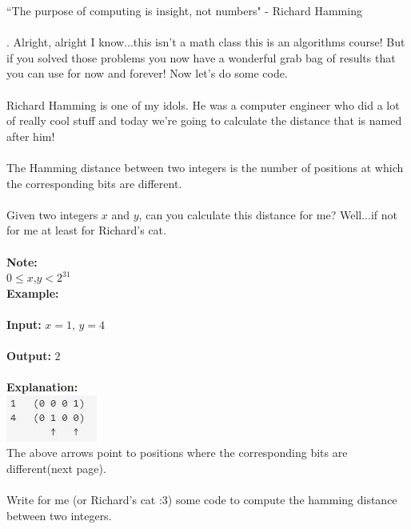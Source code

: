 \documentclass[12pt]{article}
\begin{document}
``The purpose of computing is insight, not numbers" - Richard Hamming\\\\
. Alright, alright I know...this isn't a math class this is an algorithms course! But if you solved those problems you now have a wonderful grab bag of results that you can use for now and forever! Now let's do some code.\\\\
Richard Hamming is one of my idols. He was a computer engineer who did a lot of really cool stuff and today we're going to calculate the distance that is named after him!\\\\
The Hamming distance between two integers is the number of positions at which the corresponding bits are different.\\\\
Given two integers $x$ and $y$, can you calculate this distance for me? Well...if not for me at least for Richard's cat.\\\\
\textbf{Note:}\\
$0 \leq x$,$y < 2^{31}$\\
\textbf{Example:}\\\\
\textbf{Input:} $x = 1$, $y = 4$\\\\
\textbf{Output: } $2$\\\\
\textbf{Explanation: }\\
\noindent \includegraphics{hamming.jpg}\\
The above arrows point to positions where the corresponding bits are different(next page).\\\\
Write for me (or Richard's cat :3) some code to compute the hamming distance between two integers.
\newpage
\end{document}

